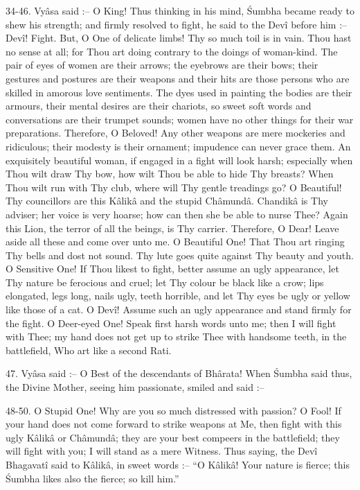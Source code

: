 34-46. Vy\^asa said :-- O King! Thus thinking in his mind, \'Sumbha became ready to shew his strength; and firmly resolved to fight, he said to the Dev\^i before him :-- Dev\^i! Fight. But, O One of delicate limbs! Thy so much toil is in vain. Thou hast no sense at all; for Thou art doing contrary to the doings of woman-kind. The pair of eyes of women are their arrows; the eyebrows are their bows; their gestures and postures are their weapons and their hits are those persons who are skilled in amorous love sentiments. The dyes used in painting the bodies are their armours, their mental desires are their chariots, so sweet soft words and conversations are their trumpet sounds; women have no other things for their war preparations. Therefore, O Beloved! Any other weapons are mere mockeries and ridiculous; their modesty is their ornament; impudence can never grace them. An exquisitely beautiful woman, if engaged in a fight will look harsh; especially when Thou wilt draw Thy bow, how wilt Thou be able to hide Thy breasts? When Thou wilt run with Thy club, where will Thy gentle treadings go? O Beautiful! Thy councillors are this K\^alik\^a and the stupid Ch\^amund\^a. Chandik\^a is Thy adviser; her voice is very hoarse; how can then she be able to nurse Thee? Again this Lion, the terror of all the beings, is Thy carrier. Therefore, O Dear! Leave aside all these and come over unto me. O Beautiful One! That Thou art ringing Thy bells and dost not sound. Thy lute goes quite against Thy beauty and youth. O Sensitive One! If Thou likest to fight, better assume an ugly appearance, let Thy nature be ferocious and cruel; let Thy colour be black like a crow; lips elongated, legs long, nails ugly, teeth horrible, and let Thy eyes be ugly or yellow like those of a cat. O Dev\^i! Assume such an ugly appearance and stand firmly for the fight. O Deer-eyed One! Speak first harsh words unto me; then I will fight with Thee; my hand does not get up to strike Thee with handsome teeth, in the battlefield, Who art like a second Rati.

47. Vy\^asa said :-- O Best of the descendants of Bh\^arata! When \'Sumbha said thus, the Divine Mother, seeing him passionate, smiled and said :--

48-50. O Stupid One! Why are you so much distressed with passion? O Fool! If your hand does not come forward to strike weapons at Me, then fight with this ugly K\^alik\^a or Ch\^amund\^a; they are your best compeers in the battlefield; they will fight with you; I will stand as a mere Witness. Thus saying, the Dev\^i Bhagavat\^i said to K\^alik\^a, in sweet words :-- ``O K\^alik\^a! Your nature is fierce; this \'Sumbha likes also the fierce; so kill him.''

